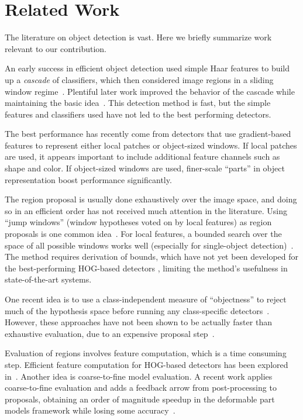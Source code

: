 \section{Related Work}
The literature on object detection is vast.
Here we briefly summarize work relevant to our contribution.

An early success in efficient object detection used simple Haar features to build up a \emph{cascade} of classifiers, which then considered image regions in a sliding window regime~\cite{Viola2001}.
Plentiful later work improved the behavior of the cascade while maintaining the basic idea~\cite{Bourdev2005}.
This detection method is fast, but the simple features and classifiers used have not led to the best performing detectors.

The best performance has recently come from detectors that use gradient-based features to represent either local patches or object-sized windows.
If local patches are used, it appears important to include additional feature channels such as shape and color.
If object-sized windows are used, finer-scale ``parts'' in object representation boost performance significantly.

The region proposal is usually done exhaustively over the image space, and doing so in an efficient order has not received much attention in the literature.
Using ``jump windows'' (window hypotheses voted on by local features) as region proposals is one common idea~\cite{Chum2007b,Vijayanarasimhan2011}.
For local features, a bounded search over the space of all possible windows works well (especially for single-object detection)~\cite{Lampert2008b}.
The method requires derivation of bounds, which have not yet been developed for the best-performing HOG-based detectors \cite{Dalal2005, Felzenszwalb2010a}, limiting the method's usefulness in state-of-the-art systems.

One recent idea is to use a class-independent measure of ``objectness'' to reject much of the hypothesis space before running any class-specific detectors~\cite{Alexe2010,Endres2010}.
However, these approaches have not been shown to be actually faster than exhaustive evaluation, due to an expensive proposal step~\cite{Endres2010}.

Evaluation of regions involves feature computation, which is a time consuming step.
Efficient feature computation for HOG-based detectors has been explored in~\cite{Dollar2010}.
Another idea is coarse-to-fine model evaluation.
A recent work applies coarse-to-fine evaluation and adds a feedback arrow from post-processing to proposals, obtaining an order of magnitude speedup in the deformable part models framework while losing some accuracy~\cite{Pedersoli2011}.

